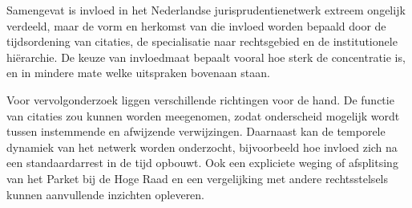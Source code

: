 \documentclass[a4paper, 12pt]{report}
\begin{document}
Samengevat is invloed in het Nederlandse jurisprudentienetwerk extreem ongelijk verdeeld, maar de vorm en herkomst van die invloed worden bepaald door de tijdsordening van citaties, de specialisatie naar rechtsgebied en de institutionele hiërarchie. De keuze van invloedmaat bepaalt vooral hoe sterk de concentratie is, en in mindere mate welke uitspraken bovenaan staan.
 
Voor vervolgonderzoek liggen verschillende richtingen voor de hand. De functie van citaties zou kunnen worden meegenomen, zodat onderscheid mogelijk wordt tussen instemmende en afwijzende verwijzingen. Daarnaast kan de temporele dynamiek van het netwerk worden onderzocht, bijvoorbeeld hoe invloed zich na een standaardarrest in de tijd opbouwt. Ook een expliciete weging of afsplitsing van het Parket bij de Hoge Raad en een vergelijking met andere rechtsstelsels kunnen aanvullende inzichten opleveren.





\printbibliography[heading=bibintoc, title={Bibliografie}]
\end{document}

